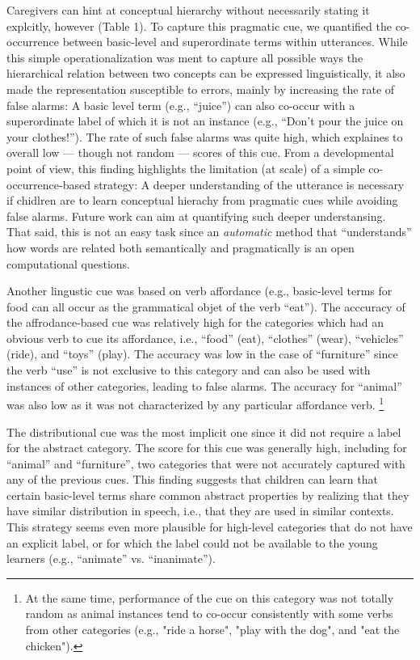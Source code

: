 \documentclass[english,,man,floatsintext]{apa6}
\let\rmarkdownfootnote\footnote%
\def\footnote{\protect\rmarkdownfootnote}
\begin{document}
Caregivers can hint at conceptual hierarchy without necessarily stating it explcitly, however (Table 1). To capture this pragmatic cue, we quantified the co-occurrence between basic-level and superordinate terms within utterances. While this simple operationalization was ment to capture all possible ways the hierarchical relation between two concepts can be expressed linguistically, it also made the representation susceptible to errors, mainly by increasing the rate of false alarms: A basic level term (e.g., \enquote{juice}) can also co-occur with a superordinate label of which it is not an instance (e.g., \enquote{Don't pour the juice on your clothes!}). The rate of such false alarms was quite high, which explaines to overall low --- though not random --- scores of this cue. From a developmental point of view, this finding highlights the limitation (at scale) of a simple co-occurrence-based strategy: A deeper understanding of the utterance is necessary if chidlren are to learn conceptual hierachy from pragmatic cues while avoiding false alarms. Future work can aim at quantifying such deeper understansing. That said, this is not an easy task since an \emph{automatic} method that ``understands'' how words are related both semantically and pragmatically is an open computational questions.

Another lingustic cue was based on verb affordance (e.g., basic-level terms for food can all occur as the grammatical objet of the verb \enquote{eat}). The acccuracy of the affrodance-based cue was relatively high for the categories which had an obvious verb to cue its affordance, i.e., \enquote{food} (eat), \enquote{clothes} (wear), \enquote{vehicles} (ride), and \enquote{toys} (play). The accuracy was low in the case of \enquote{furniture} since the verb \enquote{use} is not exclusive to this category and can also be used with instances of other categories, leading to false alarms. The accuracy for
\enquote{animal} was also low as it was not characterized by any particular affordance verb. \footnote{At the same time, performance of the cue on this category was not totally random as animal instances tend to co-occur consistently with some verbs from other categories (e.g., "ride a horse", "play with the dog", and "eat the chicken").}

The distributional cue was the most implicit one since it did not require a label for the abstract category. The score for this cue was generally high, including for \enquote{animal} and \enquote{furniture}, two categories that were not accurately captured with any of the previous
cues. This finding suggests that children can learn that certain basic-level terms share common abstract properties by realizing that they have similar distribution in speech, i.e., that they are used in similar contexts. This strategy seems even more plausible for high-level categories that do not have an explicit label, or for which the label could not be available to the young learners (e.g., \enquote{animate} vs. \enquote{inanimate}).
\end{document}
